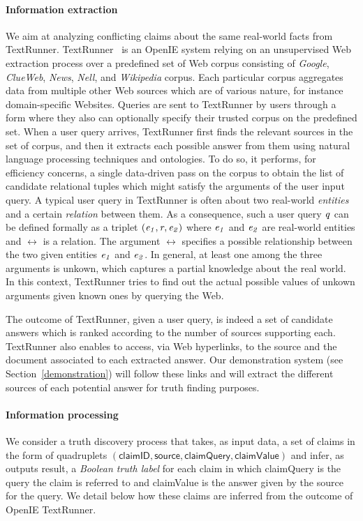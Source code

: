 \paragraph*{Information extraction} We aim at analyzing 
conflicting claims about the same real-world facts from TextRunner.
TextRunner~\cite{Yates07, Etzioni08} is an OpenIE system relying
on an unsupervised Web extraction process over a predefined 
set of Web corpus consisting of \emph{Google}, \emph{ClueWeb}, \emph{News}, \emph{Nell}, and 
\emph{Wikipedia} corpus. Each particular corpus aggregates data from multiple 
other Web sources which are of various nature, for instance domain-specific Websites.
Queries are sent to TextRunner by users through a form where 
they also can optionally specify their trusted corpus on the predefined set.
When a user query arrives, TextRunner first finds the relevant
sources in the set of corpus, and then it extracts each possible answer from them
using natural language processing techniques and ontologies. 
To do so, it performs, for efficiency concerns, a single data-driven
pass on the corpus to obtain the list of candidate relational tuples 
which might satisfy the arguments of the user input query. 
A typical user query in TextRunner is often about 
two real-world \emph{entities} and a certain \emph{relation} between them.
As a consequence, such a user query $\mathit{q}$ can be defined formally as a triplet $(\mathit{e_{1}}, \mathit{r}_{}, \mathit{e_{2}})$
where $\mathit{e_{1}}$ and $\mathit{e_{2}}$ are real-world entities and $\rel{}$ is a relation. The argument $\rel{}$ 
specifies a possible relationship between the two given entities $\mathit{e_{1}}$ and $\mathit{e_{2}}$. In general,
at least one among the three arguments is unkown, which captures a partial knowledge about the real world. 
In this context, TextRunner tries to find out the actual possible values of unkown arguments given 
known ones by querying the Web.


The outcome of TextRunner, given a user query, is indeed a set of candidate answers which is ranked according 
to the number of sources supporting each. TextRunner also enables to access, via Web hyperlinks, to the source
and the document associated to each extracted answer. Our demonstration system (see Section~\ref{demonstration})
will follow these links and will extract the different sources of each potential answer for truth finding purposes.

\paragraph*{Information processing}
We consider a truth discovery process that takes, as input data, a set of claims 
in the form of quadruplets $(\textsf{claimID}, \textsf{source}, \textsf{claimQuery},\textsf{claimValue})$
and infer, as outputs result, a \emph{Boolean truth label} for each claim in which \textsf{claimQuery} is 
the query the claim is referred to and \textsf{claimValue} is the answer given by the source for the query. 
We detail below how these claims are inferred from the outcome of OpenIE TextRunner.


